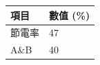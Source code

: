 \begin{tabular}{ll}
\toprule
項目 & 數值 (\%) \\
\midrule
節電率 & 47 \\
A\&B & 40 \\
\bottomrule
\end{tabular}
